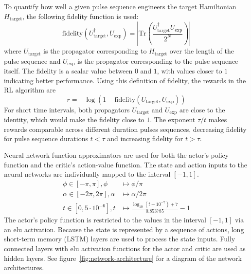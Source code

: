 \documentclass{article}
\begin{document}
To quantify how well a given pulse sequence engineers the target Hamiltonian $H_\text{target}$, the following fidelity function is used:
\begin{equation}\label{eq:fidelity}
    \text{fidelity}(U_\text{target}^\dagger, U_\text{exp}) = \left| \text{Tr}\left( \frac{U_\text{target}^\dagger U_\text{exp}}{2^N} \right) \right|
\end{equation}
where $U_\text{target}$ is the propagator corresponding to $H_\text{target}$ over the length of the pulse sequence and $U_\text{exp}$ is the propagator corresponding to the pulse sequence itself. The fidelity is a scalar value between $0$ and $1$, with values closer to $1$ indicating better performance. Using this definition of fidelity, the rewards in the RL algorithm are
\begin{equation}\label{eq:rewards}
    r = -\log\left( 1- \text{fidelity}(U_\text{target}, U_\text{exp})%
    \right)
\end{equation}
For short time intervals, both propagators $U_\text{target}$ and $U_\text{exp}$ are close to the identity, which would make the fidelity close to $1$. The exponent $\tau/t$ makes rewards comparable across different duration pulses sequences, decreasing fidelity for pulse sequence durations $t<\tau$ and increasing fidelity for $t>\tau$.

Neural network function approximators are used for both the actor's policy function and the critic's action-value function. The state and action inputs to the neural networks are individually mapped to the interval $[-1,1]$.
\begin{align}
    \phi \in [-\pi, \pi], \phi      &\mapsto \phi / \pi \\
    \alpha \in [-2\pi,2\pi],\alpha  &\mapsto \alpha / 2\pi \\
    t \in [0,5\cdot10^{-6}], t      &\mapsto
        \frac{\log_{10}(t + 10^{-7}) + 7}{0.853785} - 1
\end{align}
The actor's policy function is restricted to the values in the interval $[-1,1]$ via an elu activation.
Because the state is represented by a sequence of actions, long short-term memory (LSTM) layers are used to process the state inputs\cite{lstm}. Fully connected layers with elu activation functions for the actor and critic are used as hidden layers. See figure~\ref{fig:network-architecture} for a diagram of the network architectures.
\end{document}
